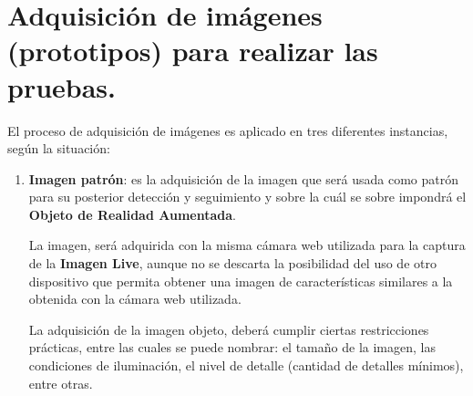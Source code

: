 \documentclass[a4paper,11pt,spanish]{article}
\begin{document}
\pagestyle{plain}

\section{Adquisición de imágenes (prototipos) para realizar las pruebas.}
El proceso de adquisición de imágenes es aplicado en tres diferentes instancias, según la situación:
\begin{enumerate}
  \item \textbf{Imagen patrón}: es la adquisición de la imagen que será usada como patrón para su posterior detección y seguimiento y sobre la cuál se sobre impondrá el \textbf{Objeto de Realidad Aumentada}.

  La imagen, será adquirida con la misma cámara web utilizada para la captura de la \textbf{Imagen Live}, aunque no se descarta la posibilidad del uso de otro dispositivo que permita obtener una imagen de características similares a la obtenida con la cámara web utilizada.

  La adquisición de la imagen objeto, deberá cumplir ciertas restricciones prácticas, entre las cuales se puede nombrar: el tamaño de la imagen, las condiciones de iluminación, el nivel de detalle (cantidad de detalles mínimos), entre otras.\label{imagenpatron_restricciones}

 


\end{enumerate}
\end{document}
